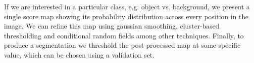 If we are interested in a particular class, e.g. object vs. background, we present a single score map showing its probability distribution across every position in the image. We can refine this map using gaussian smoothing, cluster-based thresholding and conditional random fields among other techniques. Finally, to produce a segmentation we threshold the post-processed map at some specific value, which can be chosen using a validation set.
